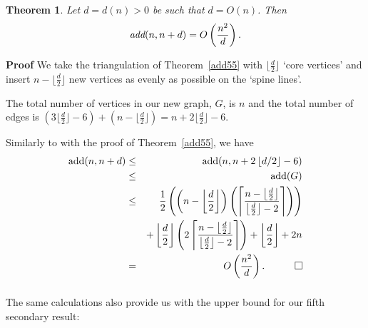 \documentclass{article}
\newtheorem{Theorem}{Theorem}
\newtheorem{Proof of Theorem}{Proof of Theorem}
\begin{document}
\begin{Theorem} \label{add56}
Let $d=d(n)>0$ be such that $d=O(n)$.
Then
\begin{displaymath}
\emph{add}(n,n + d) = O \left( \frac{n^{2}}{d} \right).
\end{displaymath}
\end{Theorem}
\textbf{Proof}
We take the triangulation of Theorem~\ref{add55} with $\lfloor \frac{d}{2} \rfloor$ `core vertices' 
and insert $n - \lfloor \frac{d}{2} \rfloor$ new vertices as evenly as possible on the `spine lines'.

The total number of vertices in our new graph, $G$, is $n$
and the total number of edges is 
$\left( 3 \lfloor \frac{d}{2} \rfloor - 6\right) + \left(n - \lfloor \frac{d}{2} \rfloor \right) 
= n + 2 \lfloor \frac{d}{2} \rfloor - 6$.

Similarly to with the proof of Theorem~\ref{add55}, we have
\begin{eqnarray*}
\textrm{add}(n,n+d) & \leq & \textrm{add}(n,n+ 2 \left \lfloor d/2 \right \rfloor - 6) \\
& \leq & \textrm{add}(G) \\
& \leq & \frac{1}{2} \left( \left( n - \left \lfloor \frac{d}{2} \right \rfloor \right) 
\left( \left \lceil \frac{n - \left \lfloor \frac{d}{2} \right \rfloor}
{ \left \lfloor \frac{d}{2} \right \rfloor - 2} \right \rceil \right) \right) \\
& & + \left \lfloor \frac{d}{2} \right \rfloor 
\left( 2 \left \lceil \frac{n - \left \lfloor \frac{d}{2} \right \rfloor}
{\left \lfloor \frac{d}{2} \right \rfloor - 2} \right \rceil \right)
+ \left \lfloor \frac{d}{2} \right \rfloor + 2n \\
& = & O \left( \frac{n^{2}}{d} \right).
\phantom{qwerty}
\setlength{\unitlength}{.25cm}
\begin{picture}(1,1)
\put(0,0){\line(1,0){1}}
\put(0,0){\line(0,1){1}}
\put(1,1){\line(-1,0){1}}
\put(1,1){\line(0,-1){1}}
\end{picture}
\end{eqnarray*}
\begin{displaymath}
\end{displaymath} 
\phantom{p}















The same calculations also provide us with the upper bound for our fifth secondary result:
\end{document}
